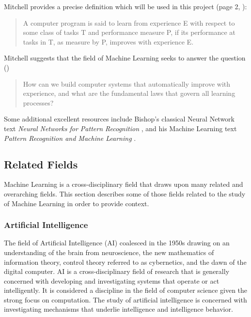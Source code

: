 \documentclass[a4paper, 11pt]{article}
\begin{document}
Mitchell provides a precise definition which will be used in this project (page 2, \cite{Mitchell1997}):

\begin{quotation}
A computer program is said to learn from experience E with respect to some class of tasks T and performance measure P, if its performance at tasks in T, as measure by P, improves with experience E.
\end{quotation}

Mitchell suggests that the field of Machine Learning seeks to answer the question (\cite{Mitchell2006})

\begin{quotation}
How can we build computer systems that automatically improve with experience, and what are the fundamental laws that govern all learning processes?
\end{quotation}

Some additional excellent resources include Bishop's classical Neural Network text \emph{Neural Networks for Pattern Recognition} \cite{Bishop1995}, and his Machine Learning text \emph{Pattern Recognition and Machine Learning} \cite{Bishop2006}.

\subsection{Related Fields}
\label{subsec:related_fields}
Machine Learning is a cross-disciplinary field that draws upon many related and overarching fields. This section describes some of those fields related to the study of Machine Learning in order to provide context.

\subsubsection{Artificial Intelligence}
The field of Artificial Intelligence (AI) coalesced in the 1950s drawing on an understanding of the brain from neuroscience, the new mathematics of information theory, control theory referred to as cybernetics, and the dawn of the digital computer. AI is a cross-disciplinary field of research that is generally concerned with developing and investigating systems that operate or act intelligently. It is considered a discipline in the field of computer science given the strong focus on computation. The study of artificial intelligence is concerned with investigating mechanisms that underlie intelligence and intelligence behavior.
\end{document}
